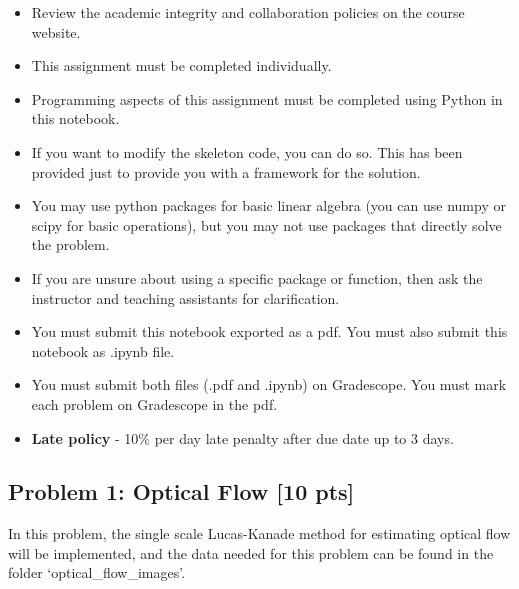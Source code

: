 \documentclass[11pt]{article}
\providecommand{\tightlist}{%
      \setlength{\itemsep}{0pt}\setlength{\parskip}{0pt}}
\begin{document}
\begin{itemize}
\tightlist
\item
  Review the academic integrity and collaboration policies on the course
  website.
\item
  This assignment must be completed individually.
\item
  Programming aspects of this assignment must be completed using Python
  in this notebook.
\item
  If you want to modify the skeleton code, you can do so. This has been
  provided just to provide you with a framework for the solution.
\item
  You may use python packages for basic linear algebra (you can use
  numpy or scipy for basic operations), but you may not use packages
  that directly solve the problem.
\item
  If you are unsure about using a specific package or function, then ask
  the instructor and teaching assistants for clarification.
\item
  You must submit this notebook exported as a pdf. You must also submit
  this notebook as .ipynb file.
\item
  You must submit both files (.pdf and .ipynb) on Gradescope. You must
  mark each problem on Gradescope in the pdf.
\item
  \textbf{Late policy} - 10\% per day late penalty after due date up to
  3 days.
\end{itemize}

    \hypertarget{problem-1-optical-flow-10-pts}{%
\subsection{Problem 1: Optical Flow {[}10
pts{]}}\label{problem-1-optical-flow-10-pts}}

In this problem, the single scale Lucas-Kanade method for estimating
optical flow will be implemented, and the data needed for this problem
can be found in the folder `optical\_flow\_images'.
\end{document}
